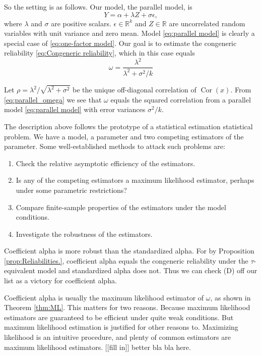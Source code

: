 \documentclass{article}
\theoremstyle{plain}
\theoremstyle{plain}
\theoremstyle{definition}
\theoremstyle{remark}
\theoremstyle{definition}
\theoremstyle{plain}
\theoremstyle{plain}
\theoremstyle{definition}
\DeclareMathOperator{\Cor}{Cor}
\begin{document}
So the setting is as follows. Our model, the parallel model, is
\begin{equation}
\label{eq:parallel model}
Y = \alpha + \lambda Z + \sigma\epsilon,
\end{equation}
where $\lambda$ and $\sigma$ are positive scalars. $\epsilon\in\mathbb{R}^k$ and $Z\in\mathbb{R}$ are uncorrelated random variables with unit variance and zero mean. Model \eqref{eq:parallel model} is clearly a special case of \eqref{eq:one-factor model}. Our goal is to estimate the congeneric reliability \eqref{eq:Congeneric reliability}, which in this case equals 
\begin{equation}
\label{eq:parallel_omega}
\omega = \frac{\lambda^2}{\lambda^2 + \sigma^2/k}
\end{equation}

Let $\rho = \lambda^2/\sqrt{\lambda^2 + \sigma^2}$ be the unique off-diagonal correlation of $\Cor(x)$. From \eqref{eq:parallel_omega} we see that $\omega$ equals the squared correlation from a parallel model \eqref{eq:parallel model} with error variances $\sigma^2/k$.

The description above follows the prototype of a statistical estimation statistical problem. We have a model, a parameter and two competing estimators of the parameter. Some well-established methods to attack such problems are:

\begin{enumerate}[label=(\Alph*)]
\item Check the relative asymptotic efficiency of the estimators. 
\item Is any of the competing estimators a maximum likelihood estimator, perhaps under some parametric restrictions?
\item Compare finite-sample properties of the estimators under the model conditions.
\item Investigate the robustness of the estimators.
\end{enumerate}

Coefficient alpha is more robust than the standardized alpha. For by Proposition \ref{prop:Reliabilities.}, coefficient alpha equals the congeneric reliability under the $\tau$-equivalent model and standardized alpha does not. Thus we can check (D) off our list as a victory for coefficient alpha.

Coefficient alpha is usually the maximum likelihood estimator of $\omega$, as shown in Theorem \ref{thm:ML}. This matters for two reasons. Because maximum likelihood estimators are guaranteed to be efficient under quite weak conditions. But maximum likelihood estimation is justified for other reasons to. Maximizing likelihood is an intuitive procedure, and plenty of common estimators are maximum likelihood estimators. [[fill in]] better bla bla here.
\end{document}
